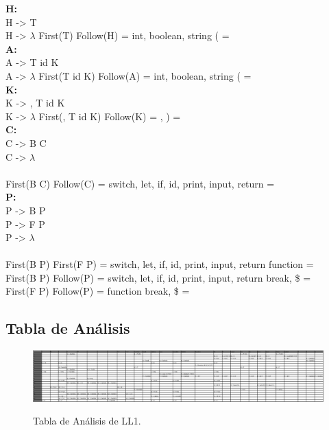 \documentclass{article}[a4paper]
\newcommand\tab[1][1cm]{\hspace*{#1}}
\begin{document}
\textbf{H:}\\
\tab H -> T \\ \tab H -> $\lambda$
\tab \tab First(T) \cap  Follow(H) = \lbrace int, boolean, string \rbrace \cap \lbrace ( \rbrace = \emptyset \\

\textbf{A:}\\
\tab A -> T id K \\ \tab A -> $\lambda$
\tab \tab First(T id K) \cap  Follow(A) = \lbrace int, boolean, string \rbrace \cap \lbrace ( \rbrace = \emptyset \\

\textbf{K:}\\
\tab K -> , T id K \\ \tab K -> $\lambda$
\tab \tab First(, T id K) \cap  Follow(K) = \lbrace , \rbrace \cap \lbrace ) \rbrace = \emptyset \\

\textbf{C:}\\
\tab C -> B C \\ \tab C -> $\lambda$ \\ \\
\tab \tab First(B C) \cap  Follow(C) = \lbrace switch, let, if, id, print, input, return \rbrace \cap \lbrace \rbrace \rbrace = \emptyset \\

\textbf{P:}\\
\tab P -> B P \\ \tab P -> F P \\ \tab P -> $\lambda$ \\ \\
\tab \tab First(B P) \cap First(F P) = \lbrace switch, let, if, id, print, input, return \rbrace \cap \lbrace function \rbrace  = \emptyset \\
\tab \tab First(B P) \cap Follow(P) = \lbrace switch, let, if, id, print, input, return \rbrace \cap \lbrace break, \$ \rbrace = \emptyset \\
\tab \tab First(F P) \cap Follow(P) = \lbrace function \rbrace \cap \lbrace break, \$ \rbrace = \emptyset \\

\subsection{Tabla de Análisis}
\begin{figure}[h!]
\centering
\href{https://docs.google.com/spreadsheets/d/17yF_afvRGqVFFo7q70U3LPK74hVvpB8d/edit?usp=sharing&ouid=100176091217744756260&rtpof=true&sd=true}{\includegraphics[width=1\textwidth]{tablaM.png}}
\caption{\label{figura:automata}Tabla de Análisis de LL1.}
\end{figure}
\end{document}
